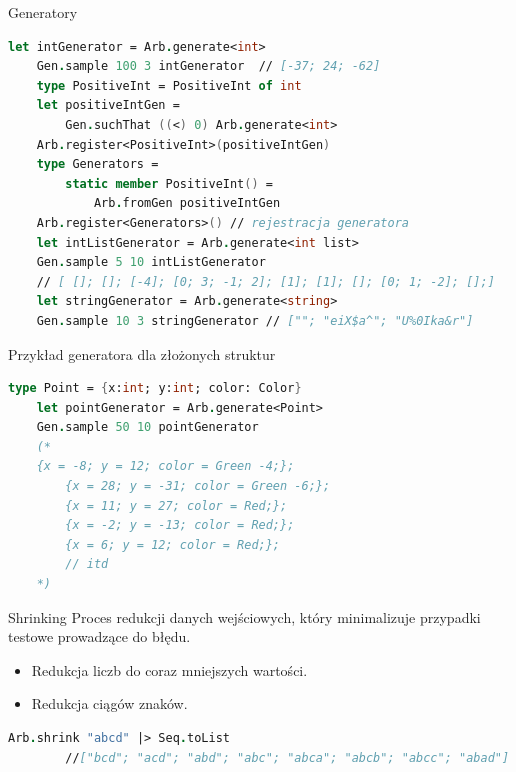     \begin{frame}[fragile]{Generatory}
    \begin{lstlisting}[language=FSharp, xleftmargin=-10pt,xrightmargin=-10pt,numbers=none,basicstyle=\ttfamily\small]
    let intGenerator = Arb.generate<int>
    Gen.sample 100 3 intGenerator  // [-37; 24; -62]
    type PositiveInt = PositiveInt of int  
    let positiveIntGen =
        Gen.suchThat ((<) 0) Arb.generate<int>
    Arb.register<PositiveInt>(positiveIntGen)     
    type Generators =
        static member PositiveInt() =
            Arb.fromGen positiveIntGen
    Arb.register<Generators>() // rejestracja generatora
    let intListGenerator = Arb.generate<int list>
    Gen.sample 5 10 intListGenerator 
    // [ []; []; [-4]; [0; 3; -1; 2]; [1]; [1]; []; [0; 1; -2]; [];]  
    let stringGenerator = Arb.generate<string>
    Gen.sample 10 3 stringGenerator // [""; "eiX$a^"; "U%0Ika&r"]     
    \end{lstlisting}
    \end{frame}
    
    \begin{frame}[fragile]{Przykład generatora dla złożonych struktur}
    \begin{lstlisting}[language=FSharp, xleftmargin=-10pt,xrightmargin=-10pt,numbers=none]
    type Point = {x:int; y:int; color: Color}
    let pointGenerator = Arb.generate<Point>
    Gen.sample 50 10 pointGenerator
    (*
    {x = -8; y = 12; color = Green -4;};
        {x = 28; y = -31; color = Green -6;};
        {x = 11; y = 27; color = Red;};
        {x = -2; y = -13; color = Red;};
        {x = 6; y = 12; color = Red;};
        // itd
    *)
    \end{lstlisting}
    \end{frame}
    
    \begin{frame}[fragile]{Shrinking}
    Proces redukcji danych wejściowych, który minimalizuje przypadki testowe prowadzące do błędu.
    \begin{itemize}
        \item Redukcja liczb do coraz mniejszych wartości.
        \item Redukcja ciągów znaków.
    \end{itemize}
    \begin{lstlisting}[language=FSharp, xleftmargin=-40pt,xrightmargin=-10pt,numbers=none]
        Arb.shrink "abcd" |> Seq.toList
        //["bcd"; "acd"; "abd"; "abc"; "abca"; "abcb"; "abcc"; "abad"]
    \end{lstlisting}
    \end{frame}
    
